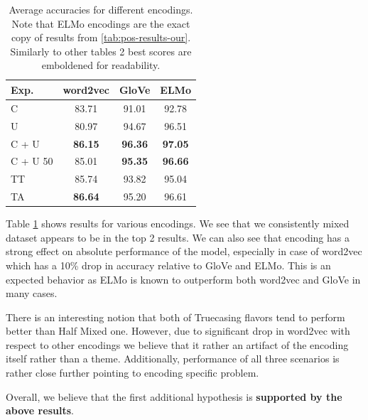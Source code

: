 \documentclass[11pt,a4paper]{article}
\begin{document}
    \begin{table}[h]
        \centering
        \begin{tabular}{|l|c|c|c|}
            \hline
            Exp.     & word2vec       & GloVe          & ELMo \\
            \hline
            C        & 83.71          & 91.01          & 92.78 \\
            U        & 80.97          & 94.67          & 96.51 \\
            C + U    & \textbf{86.15} & \textbf{96.36} & \textbf{97.05} \\
            C + U 50 & 85.01          & \textbf{95.35} & \textbf{96.66} \\
            TT       & 85.74          & 93.82          & 95.04 \\
            TA       & \textbf{86.64} & 95.20          & 96.61 \\
            \hline
        \end{tabular}
        \caption{Average accuracies for different encodings. Note that ELMo encodings are the exact copy of results from \ref{tab:pos-results-our}. Similarly to other tables 2 best scores are emboldened for readability.}
        \label{tab:epos-encodings}
    \end{table}

    Table \ref{tab:epos-encodings} shows results for various encodings. We see that we consistently mixed dataset appears to be in the top 2 results. We can also see that encoding has a strong effect on absolute performance of the model, especially in case of word2vec which has a 10\% drop in accuracy relative to GloVe and ELMo. This is an expected behavior as ELMo is known to outperform both word2vec and GloVe in many cases.

    There is an interesting notion that both of Truecasing flavors tend to perform better than Half Mixed one. However, due to significant drop in word2vec with respect to other encodings we believe that it rather an artifact of the encoding itself rather than a theme. Additionally, performance of all three scenarios is rather close further pointing to encoding specific problem.

    Overall, we believe that the first additional hypothesis is \textbf{supported by the above results}.
\end{document}

